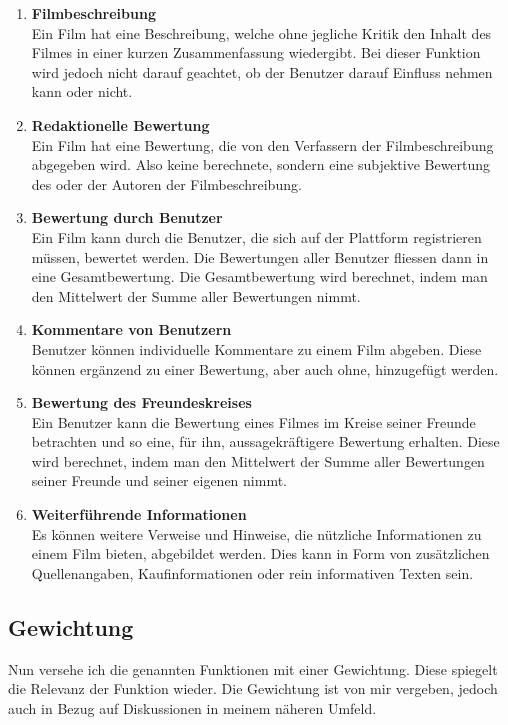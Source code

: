 \begin{enumerate}
    \item \textbf{Filmbeschreibung}\\
          Ein Film hat eine Beschreibung, welche ohne jegliche Kritik den Inhalt
          des Filmes in einer kurzen Zusammenfassung wiedergibt. Bei dieser Funktion
          wird jedoch nicht darauf geachtet, ob der Benutzer darauf Einfluss nehmen
          kann oder nicht.
    \item \textbf{Redaktionelle Bewertung}\\
          Ein Film hat eine Bewertung, die von den Verfassern der Filmbeschreibung 
          abgegeben wird. Also keine berechnete, sondern eine subjektive Bewertung
          des oder der Autoren der Filmbeschreibung.
    \item \textbf{Bewertung durch Benutzer}\\
          Ein Film kann durch die Benutzer, die sich auf der Plattform
          registrieren müssen, bewertet werden. Die Bewertungen aller Benutzer
          fliessen dann in eine Gesamtbewertung. Die Gesamtbewertung wird berechnet,
          indem man den Mittelwert der Summe aller Bewertungen nimmt.
    \item \textbf{Kommentare von Benutzern}\\
          Benutzer können individuelle Kommentare zu einem Film abgeben. Diese
          können ergänzend zu einer Bewertung, aber auch ohne, hinzugefügt werden.
    \item \textbf{Bewertung des Freundeskreises}\\
          Ein Benutzer kann die Bewertung eines Filmes im Kreise seiner Freunde
          betrachten und so eine, für ihn, aussagekräftigere Bewertung erhalten.
          Diese wird berechnet, indem man den Mittelwert der Summe aller Bewertungen
          seiner Freunde und seiner eigenen nimmt.
    \item \textbf{Weiterführende Informationen}\\
          Es können weitere Verweise und Hinweise, die nützliche Informationen
          zu einem Film bieten, abgebildet werden. Dies kann in Form von zusätzlichen
          Quellenangaben, Kaufinformationen oder rein informativen Texten sein.
\end{enumerate}

\subsection{Gewichtung}
Nun versehe ich die genannten Funktionen mit einer Gewichtung. Diese spiegelt die
Relevanz der Funktion wieder. Die Gewichtung ist von mir vergeben, jedoch auch in Bezug
auf Diskussionen in meinem näheren Umfeld.

